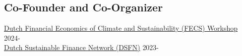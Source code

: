 \documentclass[11pt]{res} %
\newcommand{\fullhrulefill}{%
  \vspace{-1ex}%
  \hspace*{-\sectionwidth}\hrulefill%
  }
\begin{document}
\begin{resume}
\section{Co-Founder and Co-Organizer} 
\fullhrulefill \newline
\href{https://businessdatascience.nl/news/997/1st-dutch-sustainable-network-fecs-workshop-at-tinbergen-institute}{Dutch Financial Economics of Climate and Sustainability (FECS) Workshop} \hfill {2024-}\\
\href{https://sites.google.com/view/dutchsustainablefinancenetwork/dutch-sustainable-finance-network}{Dutch Sustainable Finance Network (DSFN)} \hfill  {2023-}



\vspace{0.2in} %



\end{resume}
\end{document}
